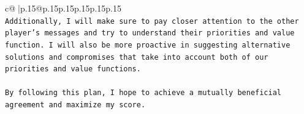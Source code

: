\documentclass{article}
\begin{document}
{\begin{supertabular}{c@{$\;$}|p{.15\linewidth}@{}p{.15\linewidth}p{.15\linewidth}p{.15\linewidth}p{.15\linewidth}p{.15\linewidth}}
{{{\\ 
\texttt{Additionally, I will make sure to pay closer attention to the other player's messages and try to understand their priorities and value function. I will also be more proactive in suggesting alternative solutions and compromises that take into account both of our priorities and value functions.} \\
\\ 
\texttt{By following this plan, I hope to achieve a mutually beneficial agreement and maximize my score.} \\
            }
        }
    }
     \\ \\

\end{supertabular}
}
\end{document}
